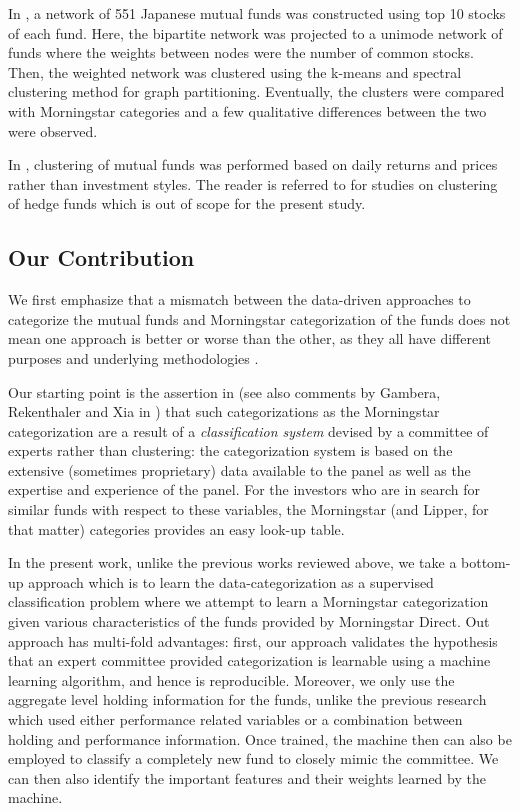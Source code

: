 \documentclass[sigconf]{acmart}
\begin{document}
In \cite{sakakibara2015clustering}, a network of 551 Japanese mutual funds was constructed using top 10 stocks of each fund. Here, the bipartite network was projected to a unimode network of funds where the weights between nodes were the number of common stocks. Then, the weighted network was clustered using the k-means and spectral clustering method for graph partitioning. Eventually, the clusters were compared with Morningstar categories and a few qualitative differences between the two were observed.

In \cite{pattarin2004clustering,agudo2005does,lytkin2008variance,corduas2008time,lisi2010clustering,gerlach2017stable}, clustering of mutual funds was performed based on daily returns and prices rather than investment styles. The reader is referred to \cite{das2003hedge,miceli2004ultrametricity,baghai2005consistency,gibson2007style,shawky2010stylistic} for studies on clustering of hedge funds which is out of scope for the present study.



\subsection{Our Contribution}
We first emphasize that a mismatch between the data-driven approaches to categorize the mutual funds and Morningstar categorization of the funds does not mean one approach is better or worse than the other, as they all have different purposes and underlying methodologies \cite{haslem2001morningstar}. 

Our starting point is the assertion in \cite{haslem2001morningstar} (see also comments by Gambera, Rekenthaler and Xia in \cite{haslem2001morningstar}) that such categorizations as the Morningstar categorization are a result of a \textit{classification system} devised by a committee of experts rather than clustering: the categorization system is based on the extensive (sometimes proprietary) data available to the panel as well as the expertise and experience of the panel. For the investors who are in search for similar funds with respect to these variables, the Morningstar (and Lipper, for that matter) categories provides an easy look-up table.


In the present work, unlike the previous works reviewed above, we take a bottom-up approach which is to learn the data-categorization as a supervised classification problem where we attempt to learn a Morningstar categorization given various characteristics of the funds provided by Morningstar Direct. Out approach has multi-fold advantages: first, our approach validates the hypothesis that an expert committee provided categorization is learnable using a machine learning algorithm, and hence is reproducible. Moreover, we only use the aggregate level holding information for the funds, unlike the previous research which used either performance related variables or a combination between holding and performance information. Once trained, the machine then can also be employed to classify a completely new fund to closely mimic the committee. We can then also identify the important features and their weights learned by the machine. 
\end{document}
